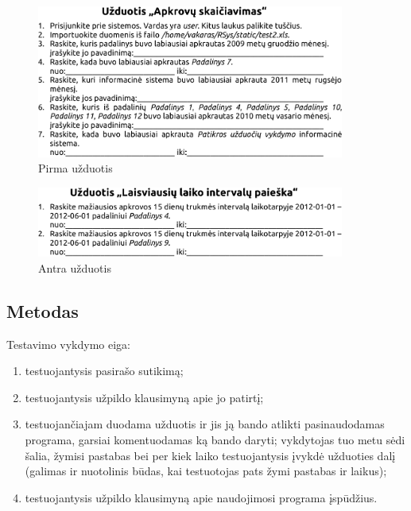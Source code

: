 \begin{figure}[H]
  \begin{center}
    \includegraphics[width=0.9\textwidth]{./4/pdfs/uzduotis1.pdf}
  \end{center}
  \caption{Pirma užduotis}
  \label{fig:uzduotis_1}
\end{figure}

\begin{figure}[H]
  \begin{center}
    \includegraphics[width=0.9\textwidth]{./4/pdfs/uzduotis2.pdf}
  \end{center}
  \caption{Antra užduotis}
  \label{fig:uzduotis_2}
\end{figure}

\subsection{Metodas}

Testavimo vykdymo eiga:
\begin{enumerate}
  \item testuojantysis pasirašo sutikimą;
  \item testuojantysis užpildo klausimyną apie jo patirtį;
  \item testuojančiajam duodama užduotis ir jis ją bando atlikti
    pasinaudodamas programa, garsiai komentuodamas ką bando daryti;
    vykdytojas tuo metu sėdi šalia, žymisi pastabas bei per kiek
    laiko testuojantysis įvykdė užduoties dalį (galimas ir nuotolinis
    būdas, kai testuotojas pats žymi pastabas ir laikus);
  \item testuojantysis užpildo klausimyną apie naudojimosi programa
    įspūdžius.
\end{enumerate}

